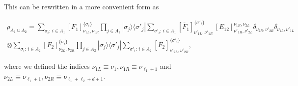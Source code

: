 \documentclass[twocolumn,superscriptaddress,prb,10pt]{revtex4-1}
\begin{document}
%
This can be rewritten in a more convenient form as 
%
\begin{widetext}
\begin{multline}
\label{rho12-s}
\rho_{A_1\cup A_2}=\sum_{\sigma_i:\, i\in A_1}
[F_1]^{\{\sigma_i\}}_{\nu_{1L},\nu_{1R}}\prod_{j\in A_1}|\sigma_j\rangle
\langle\sigma'_j|\sum_{\sigma'_i:\, i\in A_1}
[\bar F_1]^{\{\sigma'_i\}}_{\nu'_{1L},\nu'_{1R}}\,
[E_{12}]^{\nu_{1R},\nu_{2L}}_{\nu'_{1R},\nu'_{2L}}
\delta_{\nu_{2R},
\nu'_{2R}}\delta_{\nu_{1L},\nu'_{1L}}
\\\otimes\sum_{\sigma_i:\, i\in A_2}
[F_2]^{\{\sigma_{i}\}}_{\nu_{2L},
\nu_{2R}}\prod_{j\in A_2}|\sigma_j\rangle\langle\sigma'_j|
\sum_{\sigma'_i:\, i\in A_2}
[\bar F_2]^{\{\sigma'_i\}}_{\nu'_{2L},
\nu'_{2R}},
\end{multline}
\end{widetext}
%
where we defined the indices $\nu_{1L}\equiv\nu_1,\nu_{1R}\equiv\nu_{\ell_1+1}$ 
and $\nu_{2L}\equiv\nu_{\ell_1+1},\nu_{2R}\equiv\nu_{\ell_1+\ell_2+d+1}$. 
\end{document}
